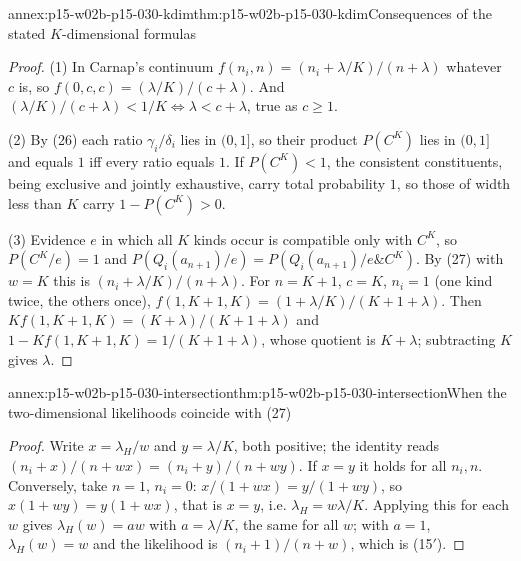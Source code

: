 \begin{annexitem}{annex:p15-w02b-p15-030-kdim}{thm:p15-w02b-p15-030-kdim}{Consequences of the stated \(K\)-dimensional formulas}
\begin{proof}
(1) In Carnap's continuum \(f(n_i,n)=(n_i+\lambda/K)/(n+\lambda)\) whatever
\(c\) is, so \(f(0,c,c)=(\lambda/K)/(c+\lambda)\). And
\((\lambda/K)/(c+\lambda)<1/K\iff\lambda<c+\lambda\), true as \(c\geq1\).

(2) By (26) each ratio \(\gamma_i/\delta_i\) lies in \((0,1]\), so their
product \(P(C^K)\) lies in \((0,1]\) and equals \(1\) iff every ratio equals
\(1\). If \(P(C^K)<1\), the consistent constituents, being exclusive and
jointly exhaustive, carry total probability \(1\), so those of width less
than \(K\) carry \(1-P(C^K)>0\).

(3) Evidence \(e\) in which all \(K\) kinds occur is compatible only with
\(C^K\), so \(P(C^K/e)=1\) and \(P(Q_i(a_{n+1})/e)=P(Q_i(a_{n+1})/e\&C^K)\). By
(27) with \(w=K\) this is \((n_i+\lambda/K)/(n+\lambda)\). For \(n=K+1\),
\(c=K\), \(n_i=1\) (one kind twice, the others once),
\(f(1,K+1,K)=(1+\lambda/K)/(K+1+\lambda)\). Then
\(Kf(1,K+1,K)=(K+\lambda)/(K+1+\lambda)\) and
\(1-Kf(1,K+1,K)=1/(K+1+\lambda)\), whose quotient is \(K+\lambda\);
subtracting \(K\) gives \(\lambda\).
\end{proof}
\end{annexitem}

\begin{annexitem}{annex:p15-w02b-p15-030-intersection}{thm:p15-w02b-p15-030-intersection}{When the two-dimensional likelihoods coincide with (27)}
\begin{proof}
Write \(x=\lambda_H/w\) and \(y=\lambda/K\), both positive; the identity reads
\((n_i+x)/(n+wx)=(n_i+y)/(n+wy)\). If \(x=y\) it holds for all \(n_i,n\).
Conversely, take \(n=1\), \(n_i=0\): \(x/(1+wx)=y/(1+wy)\), so
\(x(1+wy)=y(1+wx)\), that is \(x=y\), i.e. \(\lambda_H=w\lambda/K\). Applying
this for each \(w\) gives \(\lambda_H(w)=aw\) with \(a=\lambda/K\), the same for
all \(w\); with \(a=1\), \(\lambda_H(w)=w\) and the likelihood is
\((n_i+1)/(n+w)\), which is (15\('\)).
\end{proof}
\end{annexitem}

